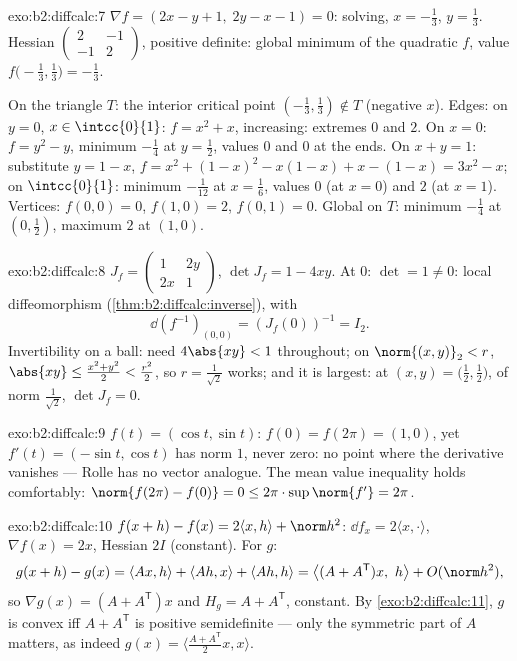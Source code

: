 \begin{solution}{exo:b2:diffcalc:7}
$\nabla f = (2x - y + 1,\; 2y - x - 1) = 0$: solving, $x =
-\frac13$, $y = \frac13$. Hessian $\begin{pmatrix} 2 & -1\\ -1 &
2\end{pmatrix}$, positive definite: global minimum of the quadratic
$f$, value $f\bigl(-\frac13, \frac13\bigr) = -\frac13$.

On the triangle $T$: the interior critical point $(-\frac13,
\frac13) \notin T$ (negative $x$). Edges: on $y = 0$, $x \in
\intcc{0}{1}$: $f = x^2 + x$, increasing: extremes $0$ and $2$. On
$x = 0$: $f = y^2 - y$, minimum $-\frac14$ at $y = \frac12$, values
$0$ and $0$ at the ends. On $x + y = 1$: substitute $y = 1 - x$,
$f = x^2 + (1-x)^2 - x(1-x) + x - (1-x) = 3x^2 - x$; on
$\intcc{0}{1}$: minimum $-\frac{1}{12}$ at $x = \frac16$, values
$0$ (at $x=0$) and $2$ (at $x=1$). Vertices: $f(0,0) = 0$, $f(1,0)
= 2$, $f(0,1) = 0$. Global on $T$: minimum $-\frac14$ at $(0,
\frac12)$, maximum $2$ at $(1, 0)$.
\end{solution}

\begin{solution}{exo:b2:diffcalc:8}
$J_f = \begin{pmatrix} 1 & 2y\\ 2x & 1\end{pmatrix}$, $\det J_f =
1 - 4xy$. At $0$: $\det = 1 \neq 0$: local diffeomorphism
(\cref{thm:b2:diffcalc:inverse}), with
\[
\dd(f^{-1})_{(0,0)} = (J_f(0))^{-1} = I_2 .
\]
Invertibility on a ball: need $4\abs{xy} < 1$ throughout; on
$\norm{(x,y)}_2 < r$, $\abs{xy} \leq \frac{x^2 + y^2}{2} <
\frac{r^2}{2}$, so $r = \frac{1}{\sqrt2}$ works; and it is largest:
at $(x, y) = \bigl(\tfrac12, \tfrac12\bigr)$, of norm
$\frac{1}{\sqrt2}$, $\det J_f = 0$.
\end{solution}

\begin{solution}{exo:b2:diffcalc:9}
$f(t) = (\cos t, \sin t)$: $f(0) = f(2\pi) = (1, 0)$, yet $f'(t) =
(-\sin t, \cos t)$ has norm $1$, never zero: no point where the
derivative vanishes --- Rolle has no vector analogue. The mean
value inequality holds comfortably: $\norm{f(2\pi) - f(0)} = 0 \leq
2\pi \cdot \sup\norm{f'} = 2\pi$.
\end{solution}

\begin{solution}{exo:b2:diffcalc:10}
$f(x+h) - f(x) = 2\langle x, h\rangle + \norm h^2$: $\dd f_x =
2\langle x, \cdot\rangle$, $\nabla f(x) = 2x$, Hessian $2I$
(constant). For $g$:
\[
g(x + h) - g(x) = \langle Ax, h\rangle + \langle Ah, x\rangle
+ \langle Ah, h\rangle
= \bigl\langle (A + A^{\mathsf T})x,\ h\bigr\rangle +
O(\norm h^2),
\]
so $\nabla g(x) = (A + A^{\mathsf T})x$ and $H_g = A +
A^{\mathsf T}$, constant. By \cref{exo:b2:diffcalc:11}, $g$ is
convex iff $A + A^{\mathsf T}$ is positive semidefinite ---
only the symmetric part of $A$ matters, as indeed $g(x) =
\langle \frac{A + A^{\mathsf T}}2 x, x\rangle$.
\end{solution}

